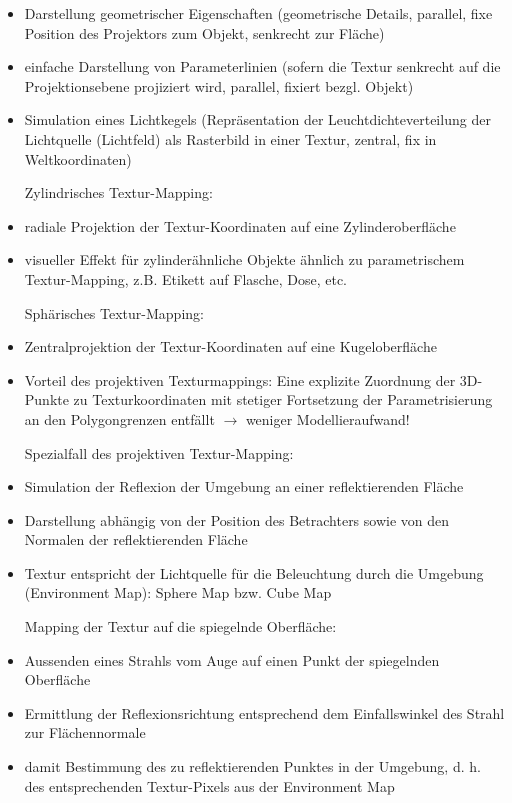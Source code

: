 \documentclass[10pt,landscape]{article}
\begin{document}
\begin{multicols}{3}
{\begin{itemize}
  Anwendungsbeispiele für projektives Textur-Mapping (Parallel- oder Zentralprojektion):
  \item Darstellung geometrischer Eigenschaften (geometrische Details, parallel, fixe Position des Projektors zum Objekt, senkrecht zur Fläche)
  \item einfache Darstellung von Parameterlinien (sofern die Textur senkrecht auf die Projektionsebene projiziert wird, parallel, fixiert bezgl. Objekt)
  \item Simulation eines Lichtkegels (Repräsentation der Leuchtdichteverteilung der Lichtquelle (Lichtfeld) als Rasterbild in einer Textur, zentral, fix in Weltkoordinaten)
  
  Zylindrisches Textur-Mapping:
  \item radiale Projektion der Textur-Koordinaten auf eine Zylinderoberfläche
  \item visueller Effekt für zylinderähnliche Objekte ähnlich zu parametrischem Textur-Mapping, z.B. Etikett auf Flasche, Dose, etc.
  
  Sphärisches Textur-Mapping:
  \item Zentralprojektion der Textur-Koordinaten auf eine Kugeloberfläche
  \item Vorteil des projektiven Texturmappings: Eine explizite Zuordnung der 3D-Punkte zu Texturkoordinaten mit stetiger Fortsetzung der Parametrisierung an den Polygongrenzen entfällt $\rightarrow$ weniger Modellieraufwand!
  
  Spezialfall des projektiven Textur-Mapping:
  \item Simulation der Reflexion der Umgebung an einer reflektierenden Fläche
  \item Darstellung abhängig von der Position des Betrachters sowie von den Normalen der reflektierenden Fläche
  \item Textur entspricht der Lichtquelle für die Beleuchtung durch die Umgebung (Environment Map): Sphere Map bzw. Cube Map
  
  Mapping der Textur auf die spiegelnde Oberfläche:
  \item Aussenden eines Strahls vom Auge auf einen Punkt der spiegelnden Oberfläche
  \item Ermittlung der Reflexionsrichtung entsprechend dem Einfallswinkel des Strahl zur Flächennormale
  \item damit Bestimmung des zu reflektierenden Punktes in der Umgebung, d. h. des entsprechenden Textur-Pixels aus der Environment Map
  

\end{itemize}}
\end{multicols}
\end{document}
